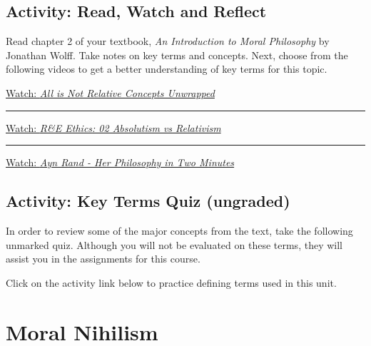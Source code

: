 \documentclass[
]{book}
\begin{document}
\hypertarget{activity-read-watch-and-reflect}{%
\subsection*{Activity: Read, Watch and Reflect}\label{activity-read-watch-and-reflect}}

\begin{reflect}
Read chapter 2 of your textbook, \emph{An Introduction to Moral Philosophy} by Jonathan Wolff. Take notes on key terms and concepts. Next, choose from the following videos to get a better understanding of key terms for this topic.

\href{https://www.youtube.com/watch?v=Z11v2nWsgGA}{Watch: \emph{All is Not Relative \textbar{} Concepts Unwrapped}}

\begin{center}\rule{0.5\linewidth}{0.5pt}\end{center}

\href{https://www.youtube.com/watch?v=DxhsYTlBNG8}{Watch: \emph{R\&E Ethics: 02 Absolutism vs Relativism}}

\begin{center}\rule{0.5\linewidth}{0.5pt}\end{center}

\href{https://www.youtube.com/watch?v=asery3UeBj4}{Watch: \emph{Ayn Rand - Her Philosophy in Two Minutes}}
\end{reflect}

\hypertarget{activity-key-terms-quiz-ungraded}{%
\subsection*{Activity: Key Terms Quiz (ungraded)}\label{activity-key-terms-quiz-ungraded}}

\begin{reflect}
In order to review some of the major concepts from the text, take the following unmarked quiz. Although you will not be evaluated on these terms, they will assist you in the assignments for this course.

Click on the activity link below to practice defining terms used in this unit.
\end{reflect}

\hypertarget{moral-nihilism}{%
\section{Moral Nihilism}\label{moral-nihilism}}
\end{document}
